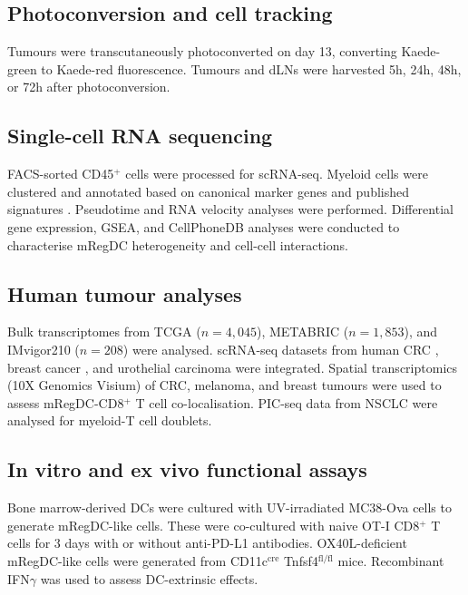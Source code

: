\documentclass[11pt]{article}
\begin{document}
\subsection{Photoconversion and cell tracking}
Tumours were transcutaneously photoconverted on day 13, converting Kaede-green to Kaede-red fluorescence. Tumours and dLNs were harvested 5h, 24h, 48h, or 72h after photoconversion.

\subsection{Single-cell RNA sequencing}
FACS-sorted CD45$^+$ cells were processed for scRNA-seq. Myeloid cells were clustered and annotated based on canonical marker genes and published signatures \citep{maier2020, gerhard2021}. Pseudotime and RNA velocity analyses were performed. Differential gene expression, GSEA, and CellPhoneDB analyses were conducted to characterise mRegDC heterogeneity and cell-cell interactions.

\subsection{Human tumour analyses}
Bulk transcriptomes from TCGA ($n = 4{,}045$), METABRIC ($n = 1{,}853$), and IMvigor210 ($n = 208$) were analysed. scRNA-seq datasets from human CRC \citep{pelka2021}, breast cancer \citep{bassez2021}, and urothelial carcinoma were integrated. Spatial transcriptomics (10X Genomics Visium) of CRC, melanoma, and breast tumours were used to assess mRegDC-CD8$^+$ T cell co-localisation. PIC-seq data from NSCLC were analysed for myeloid-T cell doublets.

\subsection{In vitro and ex vivo functional assays}
Bone marrow-derived DCs were cultured with UV-irradiated MC38-Ova cells to generate mRegDC-like cells. These were co-cultured with naive OT-I CD8$^+$ T cells for 3 days with or without anti-PD-L1 antibodies. OX40L-deficient mRegDC-like cells were generated from CD11c$^{\text{cre}}$ Tnfsf4$^{\text{fl/fl}}$ mice. Recombinant IFN$\gamma$ was used to assess DC-extrinsic effects.



\end{document}
